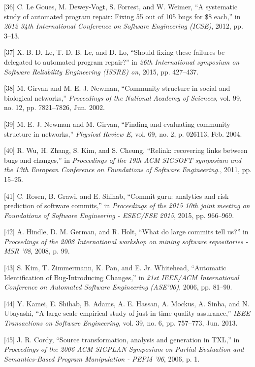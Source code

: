 {[}36{]} C. {Le Goues}, M. Dewey-Vogt, S. Forrest, and W. Weimer, ``A
systematic study of automated program repair: Fixing 55 out of 105 bugs
for \$8 each,'' in \emph{2012 34th International Conference on Software
Engineering (ICSE)}, 2012, pp. 3--13.

{[}37{]} X.-B. D. Le, T.-D. B. Le, and D. Lo, ``Should fixing these
failures be delegated to automated program repair?'' in \emph{26th International symposium on Software
Reliability Engineering (ISSRE) 
on}, 2015, pp. 427--437.

{[}38{]} M. Girvan and M. E. J. Newman, ``Community structure in social
and biological networks,'' \emph{Proceedings of the National Academy of
Sciences}, vol. 99, no. 12, pp. 7821--7826, Jun. 2002.

{[}39{]} M. E. J. Newman and M. Girvan, ``Finding and evaluating
community structure in networks,'' \emph{Physical Review E}, vol. 69,
no. 2, p. 026113, Feb. 2004.

{[}40{]} R. Wu, H. Zhang, S. Kim, and S. Cheung, ``Relink: recovering
links between bugs and changes,'' in \emph{Proceedings of the 19th ACM
SIGSOFT symposium and the 13th European Conference on Foundations of
Software Engineering.}, 2011, pp. 15--25.

{[}41{]} C. Rosen, B. Grawi, and E. Shihab, ``Commit guru: analytics and
risk prediction of software commits,'' in \emph{Proceedings of the 2015
10th joint meeting on Foundations of Software Engineering - ESEC/FSE
2015}, 2015, pp. 966--969.

{[}42{]} A. Hindle, D. M. German, and R. Holt, ``What do large commits
tell us?'' in \emph{Proceedings of the 2008 International workshop on
mining software repositories - MSR '08}, 2008, p. 99.

{[}43{]} S. Kim, T. Zimmermann, K. Pan, and E. {Jr. Whitehead},
``Automatic Identification of Bug-Introducing Changes,'' in \emph{21st
IEEE/ACM International Conference on Automated Software Engineering
(ASE'06)}, 2006, pp. 81--90.

{[}44{]} Y. Kamei, E. Shihab, B. Adams, A. E. Hassan, A. Mockus, A.
Sinha, and N. Ubayashi, ``A large-scale empirical study of just-in-time
quality assurance,'' \emph{IEEE Transactions on Software Engineering},
vol. 39, no. 6, pp. 757--773, Jun. 2013.

{[}45{]} J. R. Cordy, ``Source transformation, analysis and generation
in TXL,'' in \emph{Proceedings of the 2006 ACM SIGPLAN Symposium on
Partial Evaluation and Semantics-Based Program Manipulation - PEPM '06},
2006, p. 1.

